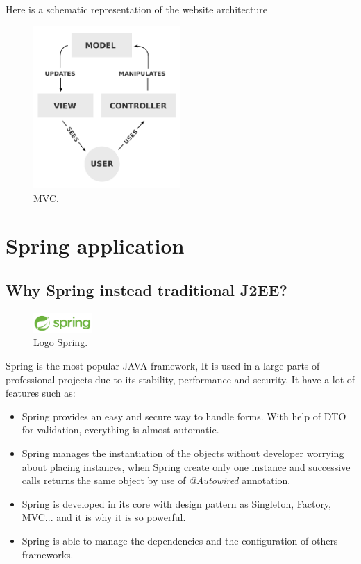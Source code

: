 Here is a schematic representation of the website architecture

\begin{figure}[!ht]
  \caption{MVC.}
  \centering
    \includegraphics[width=0.5\textwidth]{img/mvc.png}
\end{figure}

\newpage

\section{Spring application}
\subsection{Why Spring instead traditional J2EE?}

\begin{figure}[H]
  \caption{Logo Spring.}
  \centering
    \includegraphics[width=0.2\textwidth]{img/spring.png}
\end{figure}


Spring is the most popular JAVA framework, It is used in a large parts of professional projects due to its stability, performance and security.
It have a lot of features such as:

\begin{itemize}  
\item Spring provides an easy and secure way to handle forms. With help of DTO for validation, everything is almost automatic.

\item Spring manages the instantiation of the objects without developer worrying about placing instances, when Spring create only one instance and successive calls returns the same object by use of \textit{@Autowired} annotation.

\item Spring is developed in its core with design pattern as Singleton, Factory, MVC... and it is why it is so powerful.
\item Spring is able to manage the dependencies and the configuration of others frameworks.
\end{itemize}  



